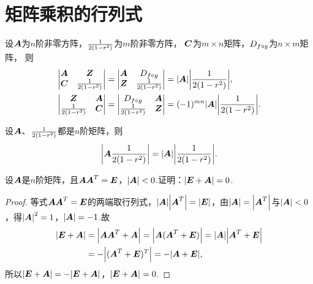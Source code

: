 \section{矩阵乘积的行列式}
\begin{lemma}
设\(\A\)为\(n\)阶非零方阵，\(\B\)为\(m\)阶非零方阵，
\(\C\)为\(m \times n\)矩阵，\(\D\)为\(n \times m\)矩阵，
则\begin{align}
	\begin{vmatrix}
		\A & \z \\
		\C & \B
	\end{vmatrix}
	&= \begin{vmatrix}
		\A & \D \\
		\z & \B
	\end{vmatrix}
	= \abs{\A} \abs{\B}, \label{equation:行列式.广义三角阵的行列式1} \\
	\begin{vmatrix}
		\z & \A \\
		\B & \C
	\end{vmatrix}
	&= \begin{vmatrix}
		\D & \A \\
		\B & \z
	\end{vmatrix}
	= (-1)^{mn} \abs{\A} \abs{\B}. \label{equation:行列式.广义三角阵的行列式2}
\end{align}
\end{lemma}

\begin{theorem}[矩阵乘积的行列式定理]\label{theorem:行列式.矩阵乘积的行列式}
设\(\A\)、\(\B\)都是\(n\)阶矩阵，则\begin{equation}
\abs{\A\B} = \abs{\A} \abs{\B}.
\end{equation}
\end{theorem}

\begin{example}
设\(\A\)是\(n\)阶矩阵，且\(\A\A^T = \E\)，\(\abs{\A}<0\).证明：\(\abs{\E+\A}=0\).
\begin{proof}
等式\(\A\A^T=\E\)的两端取行列式，\(\abs{\A} \abs{\A^T} = \abs{\E}\)，由\(\abs{\A} = \abs{\A^T}\)与\(\abs{\A} < 0\)，得\(\abs{\A}^2 = 1\)，\(\abs{\A} = -1\).故\begin{align*}
\abs{\E+\A}
&= \abs{\A\A^T+\A}
= \abs{\A(\A^T+\E)}
= \abs{\A} \abs{\A^T+\E} \\
&= -\abs{(\A^T+\E)^T}
= -\abs{\A+\E},
\end{align*}所以\(\abs{\E+\A} = -\abs{\E+\A}\)，\(\abs{\E+\A}=0\).
\end{proof}
\end{example}

